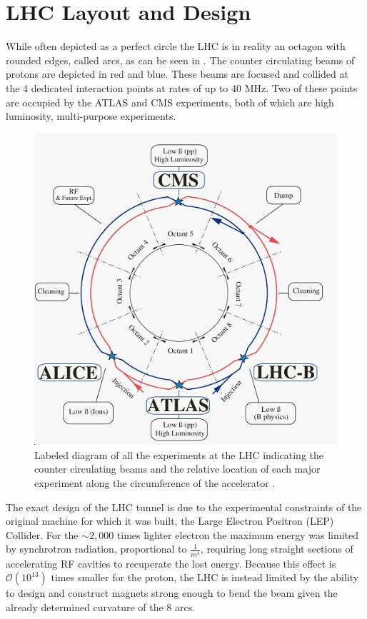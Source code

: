 \section{LHC Layout and Design} \label{sec:lhc:layout}

While often depicted as a perfect circle the LHC is in reality an octagon with
rounded edges, called arcs, as can be seen in .
The counter circulating beams of protons are depicted in red and
blue.  These beams are focused and collided at the 4 dedicated interaction
points at rates of up to 40 MHz.  Two of these points are occupied by the
ATLAS and CMS experiments, both of which are high luminosity, multi-purpose
experiments.

\begin{figure}[!htbp] 
  \begin{center}
    \includegraphics[width=0.9\linewidth]{figures/lhc/lhc_schematic.jpg}
    \caption{Labeled diagram of all the experiments at the LHC indicating the
counter circulating beams and the relative location of each major experiment
along the circumference of the accelerator \cite{BATTISTONI:2011ujk}.} 
    \label{fig:lhc_schematic} 
  \end{center} 
\end{figure}

The exact design of the LHC tunnel is due to the experimental constraints of the
original machine for which it was built, the Large Electron Positron (LEP)
Collider.  For the $\sim 2,000$ times lighter electron the maximum energy was
limited by synchrotron radiation, proportional to $\frac{1}{m^4}$, requiring
long straight sections of accelerating RF cavities to recuperate the lost
energy.  Because this effect is $\mathcal{O}(10^{13})$ times smaller for the
proton, the LHC is instead limited by the ability to design and construct magnets
strong enough to bend the beam given the already determined curvature of the 8
arcs.

